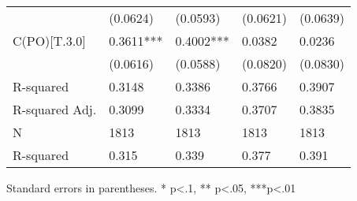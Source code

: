\begin{table}
\begin{center}
\begin{tabular}{lllll}
                         & (0.0624)   & (0.0593)   & (0.0621)   & (0.0639)    \\
C(PO)[T.3.0]             & 0.3611***  & 0.4002***  & 0.0382     & 0.0236      \\
                         & (0.0616)   & (0.0588)   & (0.0820)   & (0.0830)    \\
R-squared                & 0.3148     & 0.3386     & 0.3766     & 0.3907      \\
R-squared Adj.           & 0.3099     & 0.3334     & 0.3707     & 0.3835      \\
N                        & 1813       & 1813       & 1813       & 1813        \\
R-squared                & 0.315      & 0.339      & 0.377      & 0.391       \\
\hline
\end{tabular}
\end{center}
\end{table}
\bigskip
Standard errors in parentheses. \newline 
* p<.1, ** p<.05, ***p<.01
